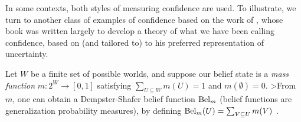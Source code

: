 \documentclass{uai2023}
\let\parencite\citep
\theoremstyle{plain}
\theoremstyle{definition}
\begin{document}
In some contexts, both styles of measuring confidence are used. 
To illustrate, 
we turn to another class of examples of confidence
based on the work of 
\citeauthor{shafer1976mathematical},
whose 
\citeyear{shafer1976mathematical} book
was written largely 
to develop a theory of what we have been calling confidence,
based on (and tailored to) to his preferred representation of
uncertainty. 



\begin{example} \label{ex:shafer}
Let $W$ be a finite set of possible worlds, 
and suppose our belief state is a 
\emph{mass function} $m : 2^W \! \to\! [0,1]$
satisfying $\sum_{U \subseteq W} m(U) \!=\! 1$ 
and $m(\emptyset) \!=\! 0$. 
>From $m$, one can obtain 
a Dempster-Shafer belief function $\mathrm{Bel}_m$ 
(belief functions are generalization probability measures), by defining
$\mathrm{Bel}_m(U) = \sum_{V \subseteq U} m(V)$
\parencite{shafer1976mathematical}.


\end{example}
\end{document}
